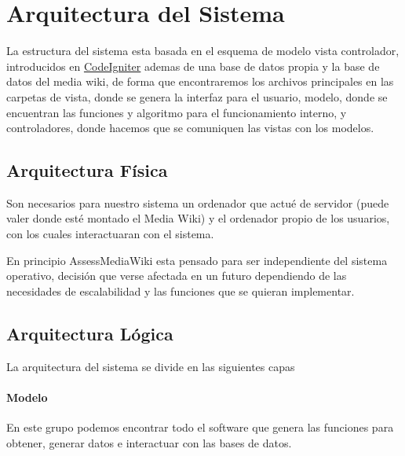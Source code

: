 

\section{Arquitectura del Sistema}
La estructura del sistema esta basada en el esquema de modelo vista controlador, introducidos en \href{http://www.codeigniter.com/}{CodeIgniter} ademas de una base de datos propia y la base de datos del media wiki, de forma que encontraremos los archivos principales en las carpetas de vista, donde se genera la interfaz para el usuario, modelo, donde se encuentran las funciones y algoritmo para el funcionamiento interno, y controladores, donde hacemos que se comuniquen las vistas con los modelos.

\subsection{Arquitectura Física}
Son necesarios para nuestro sistema un ordenador que actué de servidor (puede valer donde esté montado el Media Wiki) y el ordenador propio de los usuarios, con los cuales interactuaran con el sistema.

En principio AssessMediaWiki esta pensado para ser independiente del sistema operativo, decisión que verse afectada en un futuro dependiendo de las necesidades de escalabilidad y las funciones que se quieran implementar.

\subsection{Arquitectura Lógica}
La arquitectura del sistema se divide en las siguientes capas

\paragraph*{Modelo}
En este grupo podemos encontrar todo el software que genera las funciones para obtener, generar datos e interactuar con las bases de datos.

